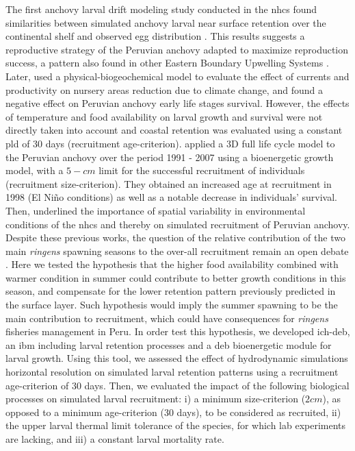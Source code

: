 The first anchovy larval drift modeling study conducted in the \acrshort{nhcs} found similarities between simulated anchovy larval near surface retention over the continental shelf and observed egg distribution \citep{BrocLett2008}. This results suggests a reproductive strategy of the Peruvian anchovy adapted to maximize reproduction success, a pattern also found in other Eastern Boundary Upwelling Systems \citep{BrocCola2009}. Later, \cite{BrocEche2013} used a physical-biogeochemical model to evaluate the effect of currents and productivity on nursery areas reduction due to climate change, and found a negative effect on Peruvian anchovy early life stages survival. However, the effects of temperature and food availability on larval growth and survival were not directly taken into account and coastal retention was evaluated using a constant \acrfull{pld} of $30$ days (recruitment age-criterion). \cite{XuChai2013} applied a 3D full life cycle model to the Peruvian anchovy over the period 1991 - 2007 using a bioenergetic growth model, with a $5-cm$ limit for the successful recruitment of individuals (recruitment size-criterion). They obtained an increased age at recruitment in 1998 (El Ni\~{n}o conditions) as well as a notable decrease in individuals’ survival. Then, \cite{XuRose2015} underlined the importance of spatial variability in environmental conditions of the \acrshort{nhcs} and thereby on simulated recruitment of Peruvian anchovy.\\

Despite these previous works, the question of the relative contribution of the two main \textit{\gls{ringens}} spawning seasons to the over-all recruitment remain an open debate \citep{WalsWhit1980,PerePena2011}. Here we tested the hypothesis that the higher food availability combined with warmer condition in summer could contribute to better growth conditions in this season, and compensate for the lower retention pattern previously predicted in the surface layer. Such hypothesis would imply the summer spawning to be the main contribution to recruitment, which could have consequences for \textit{\gls{ringens}} fisheries management in Peru. In order test this hypothesis, we developed \gls{ich-deb}, an \acrfull{ibm} including larval retention processes \citep{LettVerl2008} and a \acrfull{deb} \citep{Kooi2009} bioenergetic module for larval growth. Using this tool, we assessed the effect of hydrodynamic simulations horizontal resolution on simulated larval retention patterns using a recruitment age-criterion of $30$ days. Then, we evaluated the impact of the following biological processes on simulated larval recruitment: i) a minimum size-criterion ($2 cm$), as opposed to a minimum age-criterion ($30$ days), to be considered as recruited, ii) the upper larval thermal limit tolerance of the species, for which lab experiments are lacking, and iii) a constant larval mortality rate.

